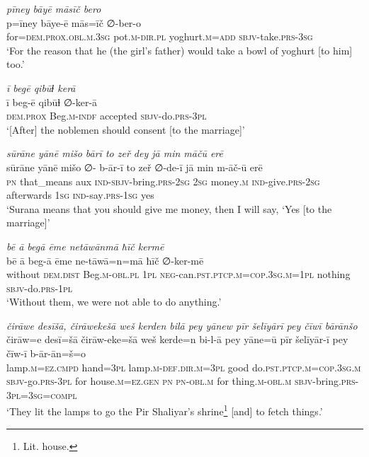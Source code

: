 \ea \label{RE.52}
\textit{pīney bāyē māsīč bero} \\ 
\gll p=īney bāye-ē mās=īč ∅-ber-o \\ 
 for=\textsc{dem.prox}\textsc{.obl}\textsc{.m}\textsc{.3sg} pot\textsc{.m}\textsc{-dir}\textsc{.pl} yoghurt\textsc{.m}\textsc{=add} \textsc{sbjv-}take\textsc{.prs}\textsc{-3sg} \\ 
\glt `For the reason that he (the girl’s father) would take a bowl of yoghurt [to him] too.'
\z 
 
\ea \label{RE.57}
\textit{ī begē qibūɫ kerā} \\ 
\gll ī beg-ē qibūɫ ∅-ker-ā \\ 
 \textsc{dem.prox} Beg\textsc{.m}\textsc{-indf} accepted \textsc{sbjv-}do\textsc{.prs}\textsc{-3pl} \\ 
\glt `[After] the noblemen should consent [to the marriage]'
\z 
 
\ea \label{RE.60}
\textit{sūrāne yānē mišo bārī to zeř dey jā min māčū erē} \\ 
\gll sūrāne yānē mišo ∅- b-ār-ī to zeř ∅-de-ī jā min m-āč-ū erē \\ 
 \textsc{pn} that\_means aux \textsc{ind-}\textsc{sbjv-}bring\textsc{.prs}-\textsc{2sg} \textsc{2sg} money\textsc{.m} \textsc{ind-}give\textsc{.prs}-\textsc{2sg} afterwards \textsc{1sg} \textsc{ind-}say\textsc{.prs}\textsc{-\textsc{1sg}} yes \\ 
\glt `Surana means that you should give me money, then I will say, ‘Yes [to the marriage]'
\z 
 
\ea \label{RE.64}
\textit{bē ā begā ēme netāwānmā ħīč kermē} \\ 
\gll bē ā beg-ā ēme ne-tāwā=n=mā ħīč ∅-ker-mē \\ 
 without \textsc{dem.dist} Beg\textsc{.m}\textsc{-obl}\textsc{.pl} \textsc{1pl} \textsc{neg-}can\textsc{.pst}\textsc{.ptcp}\textsc{.m}\textsc{=cop}\textsc{.3sg}\textsc{.m}\textsc{=\textsc{1pl}} nothing \textsc{sbjv-}do\textsc{.prs}\textsc{-\textsc{1pl}} \\ 
\glt `Without them, we were not able to do anything.'
\z 
 
\ea \label{ŽE.42}
\textit{čirāwe desīšā, čirāwekešā weš kerden bilā pey yānew pīr šelīyārī pey čīwī bārānšo} \\ 
\gll čirāw=e desī=šā čirāw-eke=šā weš kerde=n bi-l-ā pey yāne=ū pīr šelīyār-ī pey čīw-ī b-ār-ān=š=o \\ 
 lamp\textsc{.m}\textsc{=ez}\textsc{.cmpd} hand\textsc{=3pl} lamp\textsc{.m}\textsc{-def}\textsc{.dir}\textsc{.m}\textsc{=3pl} good do\textsc{.pst}\textsc{.ptcp}\textsc{.m}\textsc{=cop}\textsc{.3sg}\textsc{.m} \textsc{sbjv-}go\textsc{.prs}\textsc{-3pl} for house\textsc{.m}\textsc{\textsc{=ez.gen}} \textsc{pn} \textsc{pn}\textsc{-obl}\textsc{.m} for thing\textsc{.m}\textsc{-obl}\textsc{.m} \textsc{sbjv-}bring\textsc{.prs}\textsc{-3pl}\textsc{=3sg}\textsc{=compl} \\ 
\glt `They lit the lamps to go the Pir Shaliyar’s shrine\footnote{Lit. house.} [and] to fetch things.'
\z 
 
